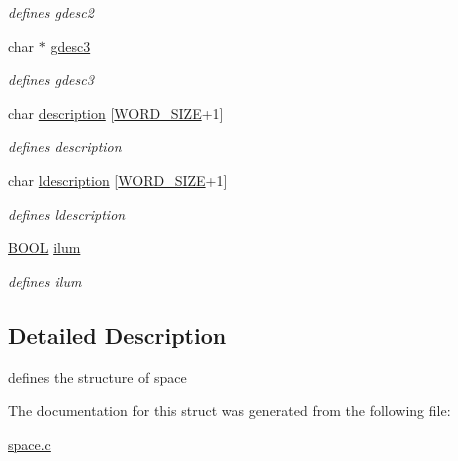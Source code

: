 \begin{DoxyCompactItemize}
\begin{DoxyCompactList}\small\item\em defines gdesc2 \end{DoxyCompactList}\item 
\mbox{\label{struct__Space_a16ac903ceb338bd5730bab4e63ddbce4}} 
char $\ast$ \hyperlink{struct__Space_a16ac903ceb338bd5730bab4e63ddbce4}{gdesc3}
\begin{DoxyCompactList}\small\item\em defines gdesc3 \end{DoxyCompactList}\item 
\mbox{\label{struct__Space_a41a1dbfab1d88b732db50d7335c2f328}} 
char \hyperlink{struct__Space_a41a1dbfab1d88b732db50d7335c2f328}{description} \mbox{[}\hyperlink{types_8h_a92ed8507d1cd2331ad09275c5c4c1c89}{W\+O\+R\+D\+\_\+\+S\+I\+ZE}+1\mbox{]}
\begin{DoxyCompactList}\small\item\em defines description \end{DoxyCompactList}\item 
\mbox{\label{struct__Space_adfa1aa02ca15f9ee7212d533a706fec2}} 
char \hyperlink{struct__Space_adfa1aa02ca15f9ee7212d533a706fec2}{ldescription} \mbox{[}\hyperlink{types_8h_a92ed8507d1cd2331ad09275c5c4c1c89}{W\+O\+R\+D\+\_\+\+S\+I\+ZE}+1\mbox{]}
\begin{DoxyCompactList}\small\item\em defines ldescription \end{DoxyCompactList}\item 
\mbox{\label{struct__Space_a381a0deaca833df846c6d341e88afc75}} 
\hyperlink{types_8h_a3e5b8192e7d9ffaf3542f1210aec18dd}{B\+O\+OL} \hyperlink{struct__Space_a381a0deaca833df846c6d341e88afc75}{ilum}
\begin{DoxyCompactList}\small\item\em defines ilum \end{DoxyCompactList}\end{DoxyCompactItemize}


\subsection{Detailed Description}
defines the structure of space 

The documentation for this struct was generated from the following file\+:\begin{DoxyCompactItemize}
\item 
\hyperlink{space_8c}{space.\+c}\end{DoxyCompactItemize}
